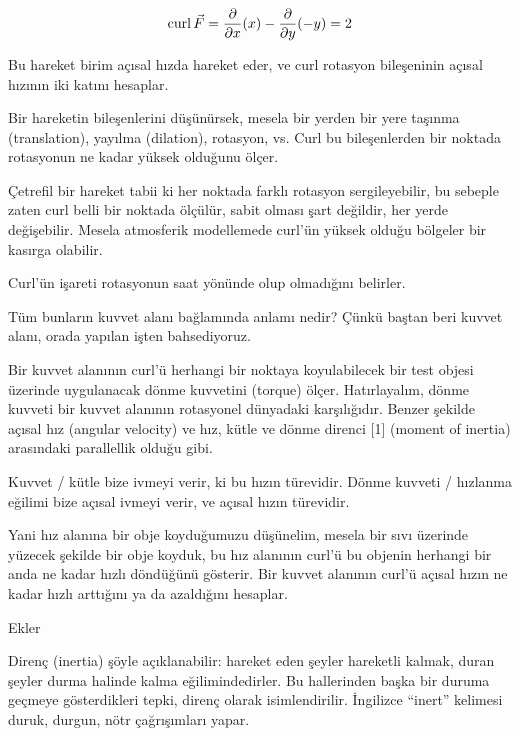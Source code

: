 \documentclass[12pt,fleqn]{article}\usepackage{../../common}
\begin{document}
$$
\operatorname{curl} \vec{F} =
\frac{\partial }{\partial x}(x) -
\frac{\partial }{\partial y}(-y) = 2
$$

Bu hareket birim açısal hızda hareket eder, ve curl rotasyon bileşeninin açısal
hızının iki katını hesaplar.

Bir hareketin bileşenlerini düşünürsek, mesela bir yerden bir yere taşınma
(translation), yayılma (dilation), rotasyon, vs. Curl bu bileşenlerden bir
noktada rotasyonun ne kadar yüksek olduğunu ölçer.

Çetrefil bir hareket tabii ki her noktada farklı rotasyon sergileyebilir, bu
sebeple zaten curl belli bir noktada ölçülür, sabit olması şart değildir, her
yerde değişebilir. Mesela atmosferik modellemede curl'ün yüksek olduğu bölgeler
bir kasırga olabilir.

Curl'ün işareti rotasyonun saat yönünde olup olmadığını belirler. 

Tüm bunların kuvvet alanı bağlamında anlamı nedir? Çünkü baştan beri kuvvet
alanı, orada yapılan işten bahsediyoruz.

Bir kuvvet alanının curl'ü herhangi bir noktaya koyulabilecek bir test objesi
üzerinde uygulanacak dönme kuvvetini (torque) ölçer. Hatırlayalım, dönme kuvveti
bir kuvvet alanının rotasyonel dünyadaki karşılığıdır. Benzer şekilde açısal hız
(angular velocity) ve hız, kütle ve dönme direnci [1] (moment of inertia)
arasındaki parallellik olduğu gibi.

Kuvvet / kütle bize ivmeyi verir, ki bu hızın türevidir. Dönme kuvveti /
hızlanma eğilimi bize açısal ivmeyi verir, ve açısal hızın türevidir.

Yani hız alanına bir obje koyduğumuzu düşünelim, mesela bir sıvı üzerinde
yüzecek şekilde bir obje koyduk, bu hız alanının curl'ü bu objenin herhangi bir
anda ne kadar hızlı döndüğünü gösterir. Bir kuvvet alanının curl'ü açısal hızın
ne kadar hızlı arttığını ya da azaldığını hesaplar.

Ekler

Direnç (inertia) şöyle açıklanabilir: hareket eden şeyler hareketli kalmak,
duran şeyler durma halinde kalma eğilimindedirler. Bu hallerinden başka bir
duruma geçmeye gösterdikleri tepki, direnç olarak isimlendirilir. İngilizce
``inert'' kelimesi duruk, durgun, nötr çağrışımları yapar.
\end{document}
